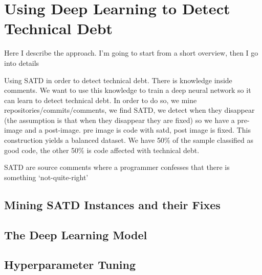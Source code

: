 

\chapter{Using Deep Learning to Detect Technical Debt}

Here I describe the approach.  I'm going to start from a short overview, then I go into details



Using SATD in order to detect technical debt.
There is knowledge inside comments. We want to use this knowledge to train a deep neural network so it can learn to detect technical debt. 
In order to do so, we mine repositories/commits/comments, we find SATD, we detect when they disappear (the assumption is that when they disappear they are fixed) so we have a pre-image and a post-image. pre image is code with satd, post image is fixed.
This construction yields a balanced dataset. We have 50\% of the sample classified as good code, the other 50\% is code affected with technical debt.

SATD are source comments where a programmer confesses that there is something `not-quite-right' 


\section{Mining SATD Instances and their Fixes}


\section{The Deep Learning Model}

\section{Hyperparameter Tuning}
